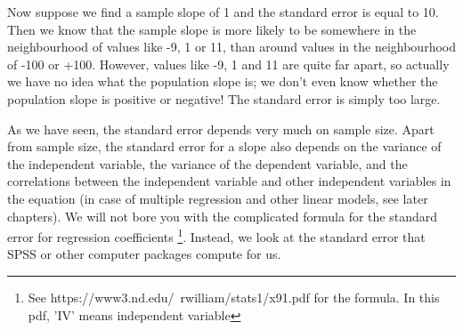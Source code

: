 \documentclass[]{report}\usepackage[]{graphicx}\usepackage[]{color}
\begin{document}
Now suppose we find a sample slope of 1 and the standard error is equal to 10. Then we know that the sample slope is more likely to be somewhere in the neighbourhood of values like -9, 1 or 11, than around values in the neighbourhood of -100 or +100. However, values like -9, 1 and 11 are quite far apart, so actually we have no idea what the population slope is; we don't even know whether the population slope is positive or negative! The standard error is simply too large.

As we have seen, the standard error depends very much on sample size. Apart from sample size, the standard error for a slope also depends on the variance of the independent variable, the variance of the dependent variable, and the correlations between the independent variable and other independent variables in the equation (in case of multiple regression and other linear models, see later chapters). We will not bore you with the complicated formula for the standard error for regression coefficients \footnote{See https://www3.nd.edu/~rwilliam/stats1/x91.pdf for the formula. In this pdf, 'IV' means independent variable}. Instead, we look at the standard error that SPSS or other computer packages compute for us.



\end{document}
